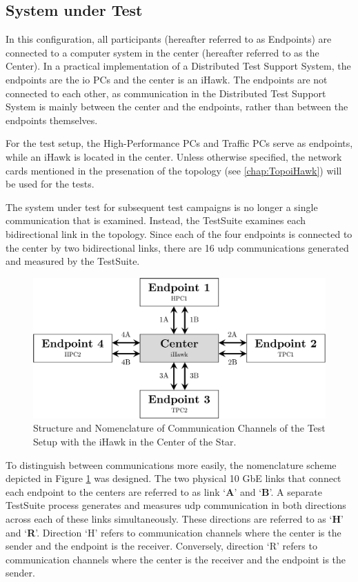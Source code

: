 \subsection{System under Test} \label{chap:ReliabIhawk:SuT}
In this configuration, all participants (hereafter referred to as Endpoints) are connected to a computer system in the center (hereafter referred to as the Center). In a practical implementation of a Distributed Test Support System, the endpoints are the \ac{io} PCs and the center is an iHawk. The endpoints are not connected to each other, as communication in the Distributed Test Support System is mainly between the center and the endpoints, rather than between the endpoints themselves.

For the test setup, the High-Performance PCs and Traffic PCs serve as endpoints, while an iHawk is located in the center. Unless otherwise specified, the network cards mentioned in the presenation of the topology (see \ref{chap:TopoiHawk}) will be used for the tests.

The system under test for subsequent test campaigns is no longer a single communication that is examined. Instead, the TestSuite examines each bidirectional link in the topology. Since each of the four endpoints is connected to the center by two bidirectional links, there are 16 \ac{udp} communications generated and measured by the TestSuite.

\begin{figure}[h!]
    \centering
    \includegraphics[width=0.8\linewidth]{figures/reliability/ihawk/topo.pdf}
    \caption{Structure and Nomenclature of Communication Channels of the Test Setup with the iHawk in the Center of the Star.}
    \label{fig:topoihawknaming}
\end{figure}

To distinguish between communications more easily, the nomenclature scheme depicted in Figure \ref{fig:topoihawknaming} was designed. The two physical 10 GbE links that connect each endpoint to the centers are referred to as link `\textbf{A}' and `\textbf{B}'. A separate TestSuite process generates and measures \ac{udp} communication in both directions across each of these links simultaneously. These directions are referred to as `\textbf{H}' and `\textbf{R}'. Direction `H' refers to communication channels where the center is the sender and the endpoint is the receiver. Conversely, direction `R' refers to communication channels where the center is the receiver and the endpoint is the sender.

